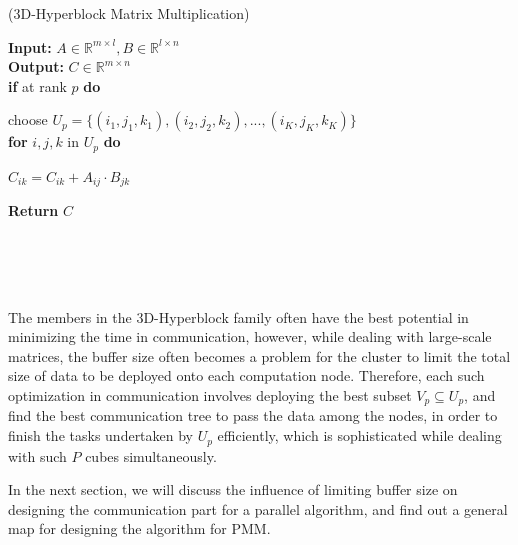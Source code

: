 \documentclass{amsart}
\theoremstyle{definition}
\theoremstyle{remark}
\numberwithin{equation}{section}
\begin{document}
\begin{algorithm}[h] 
\caption{(3D-Hyperblock Matrix Multiplication)}
\begin{adjustwidth}{0cm}{1cm} 
\textbf{Input:} $A\in \mathbb{R}^{m\times l},B\in \mathbb{R}^{l\times n}$\\
\textbf{Output:} $C\in \mathbb{R}^{m\times n}$\\
\textbf{if} at rank $p$\textbf{ do}\\
\end{adjustwidth}
	\begin{adjustwidth}{1cm}{1cm}
	choose $U_p=\{(i_1,j_1,k_1),(i_2,j_2,k_2),...,(i_K,j_K,k_K)\}$\\
	\textbf{for} $i,j,k$ in $U_p$ \textbf{ do}
	\end{adjustwidth}
		\begin{adjustwidth}{2cm}{1cm}
		$C_{ik}=C_{ik}+A_{ij}\cdot B_{jk}$\\
		\end{adjustwidth}
\begin{adjustwidth}{0cm}{1cm} 
\textbf{Return } $C$\\
\end{adjustwidth}
\end{algorithm}
~\\~\\~\\
\par
	The members in the 3D-Hyperblock family often have the best potential in minimizing the time in communication, however, while dealing with large-scale matrices, the buffer size often becomes a problem for the cluster to limit the total size of data to be deployed onto each computation node. Therefore, each such optimization in communication involves deploying the best subset $V_p\subseteq U_p$, and find the best communication tree to pass the data among the nodes, in order to finish the tasks undertaken by $U_p$ efficiently, which is sophisticated while dealing with such $P$ cubes simultaneously.\par

	In the next section, we will discuss the influence of limiting buffer size on designing the communication part for a parallel algorithm, and find out a general map for designing the algorithm for PMM.\par


\end{document}
